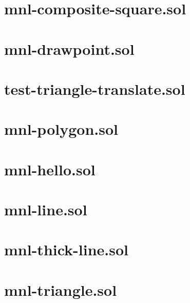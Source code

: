 \section{mnl-composite-square.sol}


\section{mnl-drawpoint.sol}


\section{test-triangle-translate.sol}


\section{mnl-polygon.sol}


\section{mnl-hello.sol}


\section{mnl-line.sol}


\section{mnl-thick-line.sol}


\section{mnl-triangle.sol}


